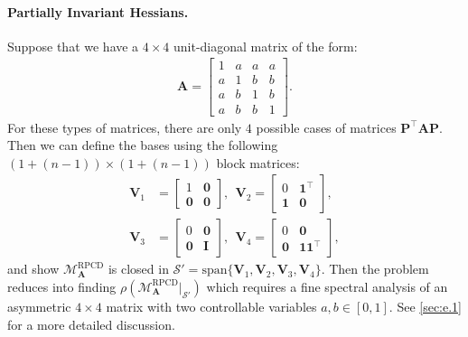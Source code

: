 \documentclass{article}
\theoremstyle{plain}
\theoremstyle{definition}
\theoremstyle{remark}
\renewcommand{\sp}{\mathrm{span}}
\newcommand{\RPCD}{\text{RPCD}} %
\newcommand{\MARPCD}{\mathcal{M}_{\bm{A}}^{\RPCD}} %
\def\vone{{\bm{1}}}
\def\mA{{\bm{A}}}
\def\mI{{\bm{I}}}
\def\mP{{\bm{P}}}
\def\mV{{\bm{V}}}
\def\gS{{\mathcal{S}}}
\begin{document}
\paragraph{Partially Invariant Hessians.}
Suppose that we have a $4 \times 4$ unit-diagonal matrix of the form:
\begin{align*}
    \mA = \begin{bmatrix}
        1 & a & a & a \\
        a & 1 & b & b \\
        a & b & 1 & b \\
        a & b & b & 1
    \end{bmatrix}.
\end{align*}
For these types of matrices, there are only $4$ possible cases of matrices $\mP^{\top} \mA \mP$.
Then we can define the bases using the following $(1+(n-1)) \times (1+(n-1))$ block matrices:
\begin{align*}
    \mV_{1} &= \begin{bmatrix}
        1 & \bm{0} \\ \bm{0} & \bm{0}
    \end{bmatrix}, \ \ 
    \mV_{2} = \begin{bmatrix}
        0 & \vone^{\top} \\ \vone & \bm{0}
    \end{bmatrix}, \\
    \mV_{3} &= \begin{bmatrix}
        0 & \bm{0} \\ \bm{0} & \mI
    \end{bmatrix}, \ \
    \mV_{4} = \begin{bmatrix}
        0 & \bm{0} \\ \bm{0} & \vone \vone^{\top}
    \end{bmatrix},
\end{align*}
and show $\MARPCD$ is closed in $\gS' = \sp \{ \mV_{1}, \mV_{2}, \mV_{3}, \mV_{4} \}$.
Then the problem reduces into finding $\rho(\MARPCD|_{\gS'})$ which requires a fine spectral analysis of an asymmetric $4 \times 4$ matrix with two controllable variables $a, b \in [0, 1]$. %
See \cref{sec:e.1} for a more detailed discussion.
\end{document}
